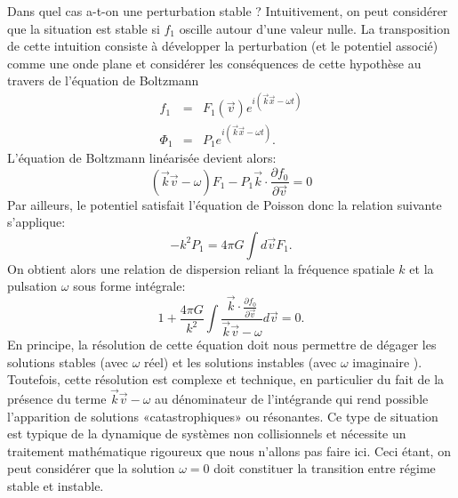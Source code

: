 Dans quel cas a-t-on une perturbation stable ? Intuitivement, on peut considérer que la situation est stable si $f_1$ oscille autour d'une valeur nulle. La transposition de cette intuition consiste à développer la perturbation (et le potentiel associé) comme une onde plane et considérer les conséquences de cette hypothèse au travers de l'équation de Boltzmann
\begin{eqnarray}
f_1&=&F_1(\vec{v})e^{i(\vec{k}\vec{x}-\omega t)}\\
\Phi_1&=&P_1e^{i(\vec{k}\vec{x}-\omega t)}.
\end{eqnarray}
L'équation de Boltzmann linéarisée devient alors:
\begin{equation}
(\vec{k}\vec{v}-\omega )F_1-P_1\vec{k}\cdot\frac{\partial f_0}{\partial \vec{v}}=0
\end{equation}
Par ailleurs, le potentiel satisfait l'équation de Poisson donc la relation suivante s'applique:
\begin{equation}
-k^2 P_1=4\pi G \int d\vec{v} F_1.
\end{equation}
On obtient alors une relation de dispersion reliant la fréquence spatiale $k$ et la pulsation $\omega$ sous forme intégrale:
\begin{equation}
1+\frac{4\pi G}{k^2}\int \frac{\vec{k}\cdot\frac{\partial f_0}{\partial \vec{v}}}{\vec{k}\vec{v}-\omega}d\vec{v}=0.
\end{equation}
En principe, la résolution de cette équation doit nous permettre de dégager les solutions stables (avec $\omega$ réel) et les solutions instables (avec $\omega$ imaginaire ). Toutefois, cette résolution est complexe et technique, en particulier du fait de la présence du terme $\vec{k}\vec{v}-\omega$ au dénominateur de l'intégrande qui rend possible l'apparition de solutions «catastrophiques» ou résonantes. Ce type de situation est typique de la dynamique de systèmes non collisionnels et nécessite un traitement mathématique rigoureux que nous n'allons pas faire ici. Ceci étant, on peut considérer que la solution $\omega=0$ doit constituer la transition entre régime stable et instable.

